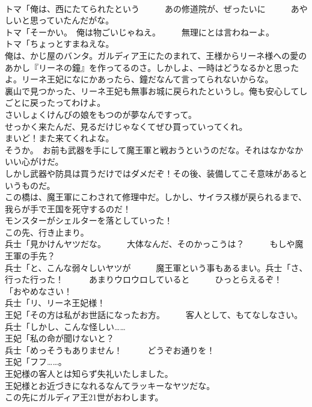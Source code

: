\documentclass[8pt]{extreport}
\begin{document}
\begin{CJK}{UTF8}{min}
\\	トマ「俺は、西にたてられたという　　　あの修道院が、ぜったいに　　　あやしいと思っていたんだがな。	
\\	トマ「そーかい。　俺は物ごいじゃねえ。　　　無理にとは言わねーよ。	
\\	トマ「ちょっとすまねえな。	
\\	俺は、かじ屋のバンタ。ガルディア王にたのまれて、王様からリーネ様への愛のあかし『リーネの鐘』を作ってるのさ。しかしよ、一時はどうなるかと思ったよ。リーネ王妃になにかあったら、鐘だなんて言ってられないからな。	
\\	裏山で見つかった、リーネ王妃も無事お城に戻られたというし。俺も安心してしごとに戻ったってわけよ。	
\\	さいしょくけんびの娘をもつのが夢なんですって。	
\\	せっかく来たんだ、見るだけじゃなくてぜひ買っていってくれ。	
\\	まいど！また来てくれよな。	
\\	そうか。　お前も武器を手にして魔王軍と戦おうというのだな。それはなかなかいい心がけだ。	
\\	しかし武器や防具は買うだけではダメだぞ！その後、装備してこそ意味があるというものだ。	
\\	この橋は、魔王軍にこわされて修理中だ。しかし、サイラス様が戻られるまで、我らが手で王国を死守するのだ！	
\\	モンスターがシェルターを落としていった！	
\\	この先、行き止まり。	
\\	兵士「見かけんヤツだな。　　　大体なんだ、そのかっこうは？　　　もしや魔王軍の手先？	
\\	兵士「と、こんな弱々しいヤツが　　　魔王軍という事もあるまい。兵士「さ、行った行った！　　　あまりウロウロしていると　　　ひっとらえるぞ！	
\\	「おやめなさい！	
\\	兵士「リ、リーネ王妃様！	
\\	王妃「その方は私がお世話になったお方。　　　客人として、もてなしなさい。	
\\	兵士「しかし、こんな怪しい……	
\\	王妃「私の命が聞けないと？	
\\	兵士「めっそうもありません！　　　どうぞお通りを！	
\\	王妃「フフ……。	
\\	王妃様の客人とは知らず失礼いたしました。	
\\	王妃様とお近づきになれるなんてラッキーなヤツだな。	
\\	この先にガルディア王21世がおわします。	

\end{CJK}
\end{document}
